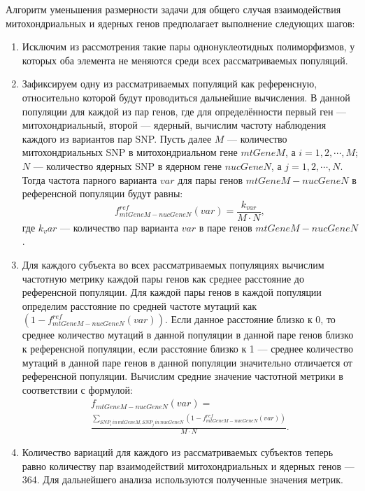 Алгоритм уменьшения размерности задачи для общего случая взаимодействия митохондриальных и ядерных генов предполагает выполнение следующих шагов:
\begin{enumerate}
	\item Исключим из рассмотрения такие пары однонуклеотидных полиморфизмов, у которых оба элемента не меняются среди всех рассматриваемых популяций.
	\item Зафиксируем одну из рассматриваемых популяций как референсную, относительно которой будут проводиться дальнейшие вычисления. В данной популяции для каждой из пар генов, где для определённости первый ген --- митохондриальный, второй --- ядерный, вычислим частоту наблюдения каждого из вариантов пар SNP. Пусть далее $M$ --- количество митохондриальных SNP в митохондриальном гене $mtGene M$, а $i = 1, 2, \cdots, M$; $N$ --- количество ядерных SNP в ядерном гене $nucGene N$, а $j = 1, 2, \cdots, N$. Тогда частота парного варианта $var$ для пары генов $mtGene M-nucGene N$ в референсной популяции будут равны:
	\begin{equation}
	\label{eq:f_ref_mt_nuc}
	f_{mtGene M-nucGene N}^{ref} (var) = \frac{k_{var}}{M\cdot N},
	\end{equation}
	где $k_var$ --- количество пар варианта $var$ в паре генов $mtGene M-nucGene N$.
	\item Для каждого субъекта во всех рассматриваемых популяциях вычислим частотную метрику каждой пары генов как среднее расстояние до референсной популяции. Для каждой пары генов в каждой популяции определим расстояние по средней частоте мутаций как $\left(1 - f_{mtGene M-nucGene N}^{ref} (var)\right)$. Если данное расстояние близко к 0, то среднее количество мутаций в данной популяции в данной паре генов близко к референсной популяции, если расстояние близко к 1 --- среднее количество мутаций в данной паре генов в данной популяции значительно отличается от референсной популяции. Вычислим средние значение частотной метрики в соответствии с формулой:
	\begin{equation}
	\label{eq:f_mt_nuc}
	\begin{multlined}
	f_{mtGene M-nucGene N} (var) =\\ \frac{\sum_{SNP_i\,in\,mtGene M, SNP_j\,in\,nucGene N} \left(1 - f_{mtGene M-nucGene N}^{ref} (var)\right)}{M\cdot N}.
	\end{multlined}
	\end{equation}
	\item Количество вариаций для каждого из рассматриваемых субъектов теперь равно количеству пар взаимодействий митохондриальных и ядерных генов --- 364. Для дальнейшего анализа используются полученные значения метрик.
\end{enumerate}


